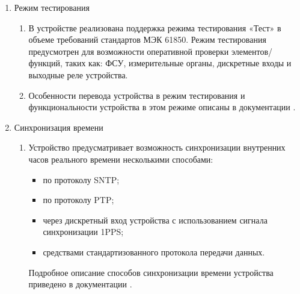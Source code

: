 \begin{enumerate}[label=\arabic{section}.\arabic{subsection}.\arabic*, labelsep=4pt, leftmargin=0pt, itemindent=57pt]
\begin{enumerate}[label=\arabic{section}.\arabic{subsection}.\arabic{enumi}.\arabic*, labelsep=4pt, leftmargin=0em, itemindent=65pt, parsep=0pt]
\item
Данные о событиях сохраняются в энергонезависимой памяти.
При заполнении журнала событий перезапись осуществляется от более старых событий к новым, то есть циклически.
Удаление информации из журнала событий пользователем невозможно.
Перечень сигналов, доступных для регистрации в журнале событий, приведен в приложении \ref{app:signals}.

\end{enumerate}

\item Режим тестирования
\begin{enumerate}[label=\arabic{section}.\arabic{subsection}.\arabic{enumi}.\arabic*, labelsep=4pt, leftmargin=0em, itemindent=65pt, parsep=0pt]

\item 
В устройстве реализована поддержка режима тестирования «Тест» в объеме требований стандартов МЭК 61850.
Режим тестирования предусмотрен для возможности оперативной проверки элементов/функций, таких как: ФСУ, измерительные органы, дискретные входы и выходные реле устройства.

\item 
Особенности перевода устройства в режим тестирования и функциональности устройства в этом режиме описаны в документации \ManualUnitGeneral.

\end{enumerate}

\item Синхронизация времени
\begin{enumerate}[label=\arabic{section}.\arabic{subsection}.\arabic{enumi}.\arabic*, labelsep=4pt, leftmargin=0em, itemindent=65pt, parsep=0pt]

\item
Устройство предусматривает возможность синхронизации внутренних часов реального времени несколькими способами:
\begin{itemize}
\item по протоколу SNTP;
\item по протоколу PTP;
\item через дискретный вход устройства с использованием сигнала синхронизации 1PPS;
\item {средствами стандартизованного протокола передачи данных.}
\end{itemize}
Подробное описание способов синхронизации времени устройства приведено в документации \ManualUnitGeneral.


\end{enumerate}
\end{enumerate}
